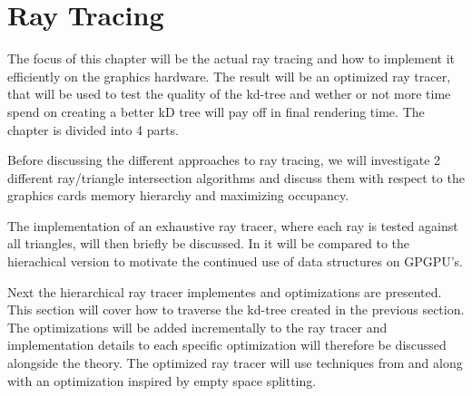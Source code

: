 


\chapter{Ray Tracing}\label{chp:rayTracing}




The focus of this chapter will be the actual ray tracing and how to
implement it efficiently on the graphics hardware. The result will be
an optimized ray tracer, that will be used to test the quality of the
kd-tree and wether or not more time spend on creating a better kD tree
will pay off in final rendering time. The chapter is divided into 4
parts.

Before discussing the different approaches to ray tracing, we will
investigate 2 different ray/triangle intersection algorithms and
discuss them with respect to the graphics cards memory hierarchy and
maximizing occupancy.

The implementation of an exhaustive ray tracer, where each ray is
tested against all triangles, will then briefly be discussed. In
 it will be compared to the hierachical
version to motivate the continued use of data structures on GPGPU's.

Next the hierarchical ray tracer implementes and optimizations are
presented. This section will cover how to traverse the kd-tree created
in the previous section. The optimizations will be added incrementally
to the ray tracer and implementation details to each specific
optimization will therefore be discussed alongside the theory. The
optimized ray tracer will use techniques from  and
 along with an optimization inspired by empty space
splitting.

